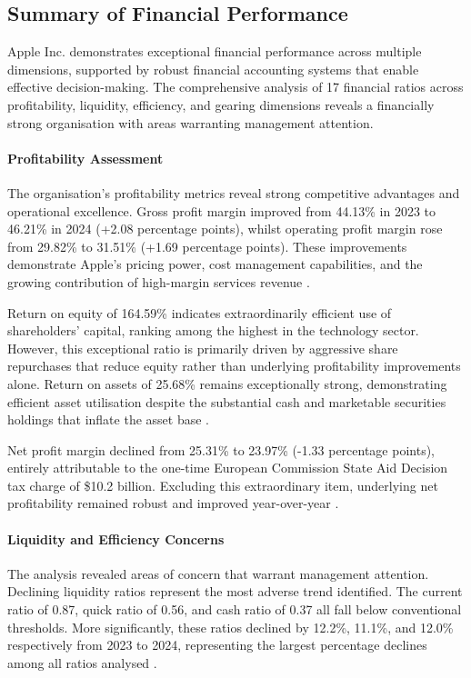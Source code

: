 \documentclass[12pt,a4paper]{article}
\begin{document}
\subsection{Summary of Financial Performance}

Apple Inc. demonstrates exceptional financial performance across multiple dimensions, supported by robust financial accounting systems that enable effective decision-making. The comprehensive analysis of 17 financial ratios across profitability, liquidity, efficiency, and gearing dimensions reveals a financially strong organisation with areas warranting management attention.

\paragraph{Profitability Assessment}

The organisation's profitability metrics reveal strong competitive advantages and operational excellence. Gross profit margin improved from 44.13\% in 2023 to 46.21\% in 2024 (+2.08 percentage points), whilst operating profit margin rose from 29.82\% to 31.51\% (+1.69 percentage points). These improvements demonstrate Apple's pricing power, cost management capabilities, and the growing contribution of high-margin services revenue \citep{apple202410k}.

Return on equity of 164.59\% indicates extraordinarily efficient use of shareholders' capital, ranking among the highest in the technology sector. However, this exceptional ratio is primarily driven by aggressive share repurchases that reduce equity rather than underlying profitability improvements alone. Return on assets of 25.68\% remains exceptionally strong, demonstrating efficient asset utilisation despite the substantial cash and marketable securities holdings that inflate the asset base \citep{macrotrends2024}.

Net profit margin declined from 25.31\% to 23.97\% (-1.33 percentage points), entirely attributable to the one-time European Commission State Aid Decision tax charge of \$10.2 billion. Excluding this extraordinary item, underlying net profitability remained robust and improved year-over-year \citep{apple202410k}.

\paragraph{Liquidity and Efficiency Concerns}

The analysis revealed areas of concern that warrant management attention. Declining liquidity ratios represent the most adverse trend identified. The current ratio of 0.87, quick ratio of 0.56, and cash ratio of 0.37 all fall below conventional thresholds. More significantly, these ratios declined by 12.2\%, 11.1\%, and 12.0\% respectively from 2023 to 2024, representing the largest percentage declines among all ratios analysed \citep{apple202410k}.
\end{document}
